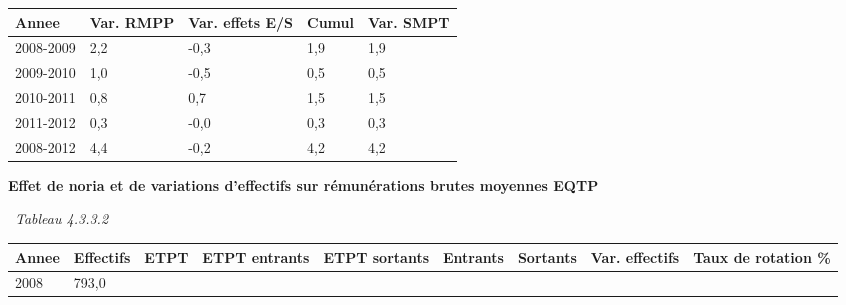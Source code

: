 \begin{longtable}[]{@{}lllll@{}}
\toprule
Annee & Var. RMPP & Var. effets E/S & Cumul & Var. SMPT\tabularnewline
\midrule
\endhead
2008-2009 & 2,2 & -0,3 & 1,9 & 1,9\tabularnewline
2009-2010 & 1,0 & -0,5 & 0,5 & 0,5\tabularnewline
2010-2011 & 0,8 & 0,7 & 1,5 & 1,5\tabularnewline
2011-2012 & 0,3 & -0,0 & 0,3 & 0,3\tabularnewline
2008-2012 & 4,4 & -0,2 & 4,2 & 4,2\tabularnewline
\bottomrule
\end{longtable}

\textbf{Effet de noria et de variations d'effectifs sur rémunérations
brutes moyennes EQTP}

~\emph{Tableau 4.3.3.2}

\begin{longtable}[]{@{}lllllllll@{}}
\toprule
\begin{minipage}[b]{0.05\columnwidth}\raggedright
Annee\strut
\end{minipage} & \begin{minipage}[b]{0.08\columnwidth}\raggedright
Effectifs\strut
\end{minipage} & \begin{minipage}[b]{0.05\columnwidth}\raggedright
ETPT\strut
\end{minipage} & \begin{minipage}[b]{0.10\columnwidth}\raggedright
ETPT entrants\strut
\end{minipage} & \begin{minipage}[b]{0.10\columnwidth}\raggedright
ETPT sortants\strut
\end{minipage} & \begin{minipage}[b]{0.07\columnwidth}\raggedright
Entrants\strut
\end{minipage} & \begin{minipage}[b]{0.07\columnwidth}\raggedright
Sortants\strut
\end{minipage} & \begin{minipage}[b]{0.11\columnwidth}\raggedright
Var. effectifs\strut
\end{minipage} & \begin{minipage}[b]{0.14\columnwidth}\raggedright
Taux de rotation \%\strut
\end{minipage}\tabularnewline
\midrule
\endhead
\begin{minipage}[t]{0.05\columnwidth}\raggedright
2008\strut
\end{minipage} & \begin{minipage}[t]{0.08\columnwidth}\raggedright
793,0\strut
\end{minipage} & \begin{minipage}[t]{0.05\columnwidth}\raggedright

\end{minipage}
\end{longtable}
